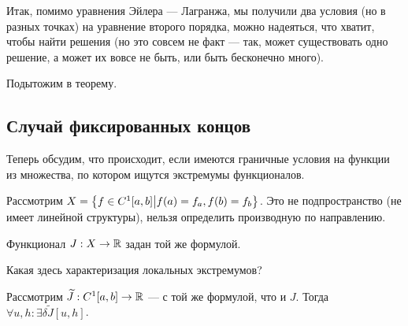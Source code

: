 \documentclass[a4paper]{article}
\begin{document}
    Итак, помимо уравнения Эйлера --- Лагранжа, мы получили два условия (но в разных точках) на уравнение второго порядка, можно надеяться, что хватит, чтобы найти решения (но это совсем не факт --- так, может существовать одно решение, а может их вовсе не быть, или быть бесконечно много).

    Подытожим в теорему.
    \subsection{Случай фиксированных концов}
    Теперь обсудим, что происходит, если имеются граничные условия на функции из множества, по котором ищутся экстремумы функционалов.

    Рассмотрим $X = \left\{f \in C^1[a, b]\middle|f(a) = f_a, f(b) = f_b\right\}$.
    Это не подпространство (не имеет линейной структуры), нельзя определить производную по направлению.

    Функционал $J: X \rightarrow \mathbb{R}$ задан той же формулой.

    Какая здесь характеризация локальных экстремумов?

    Рассмотрим $\widetilde{J}: C^1[a, b] \rightarrow \mathbb{R}$ --- с той же формулой, что и $J$.
    Тогда $\forall u, h: \exists \delta\tilde{J}[u, h]$.
\end{document}
